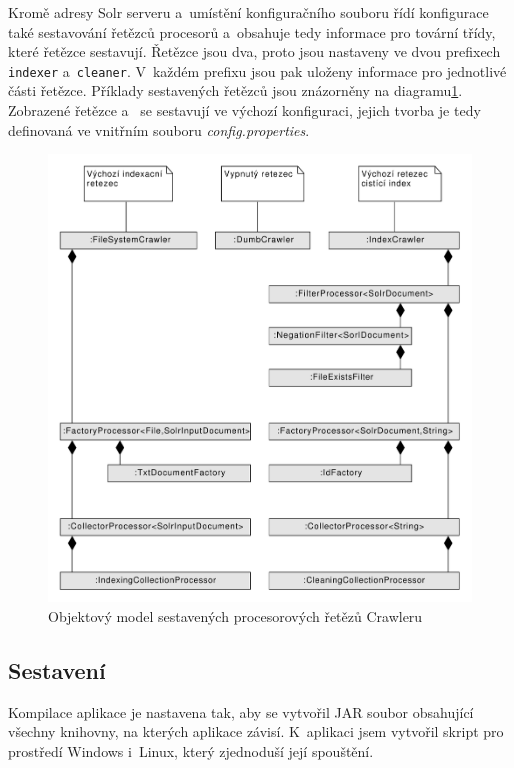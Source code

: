 Kromě adresy Solr serveru a~umístění konfiguračního souboru řídí konfigurace také sestavování řetězců procesorů a~obsahuje tedy informace pro tovární třídy, které řetězce sestavují. Řetězce jsou dva, proto jsou nastaveny ve dvou prefixech \verb|indexer| a~\verb|cleaner|. V~každém prefixu jsou pak uloženy informace pro jednotlivé části řetězce. Příklady sestavených řetězců jsou znázorněny na diagramu\ref{fig:ProcessorChain}. Zobrazené řetězce  a~ se sestavují ve výchozí konfiguraci, jejich tvorba je tedy definovaná ve vnitřním souboru \emph{config.properties}.

\begin{figure}[h]
\begin{center}
\includegraphics[width=13cm]{ProcessorChain}
\caption{Objektový model sestavených procesorových řetězů Crawleru}
\label{fig:ProcessorChain}
\end{center}
\end{figure}


\subsection{Sestavení}
Kompilace aplikace je nastavena tak, aby se vytvořil JAR soubor obsahující všechny knihovny, na kterých aplikace závisí. K~aplikaci jsem vytvořil skript pro prostředí Windows i~Linux, který zjednoduší její spouštění.

